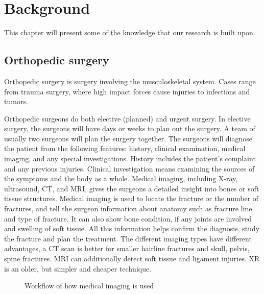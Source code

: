 \documentclass[a4paper]{report}
\begin{document}
\chapter{Background}\label{Background}
This chapter will present some of the knowledge that our research is built upon.

\section{Orthopedic surgery}

Orthopedic surgery is surgery involving the musculoskeletal system. Cases range from trauma surgery, where high impact forces cause injuries to infections and tumors\cite{swiontkowski_manual_2013}.

Orthopedic surgeons do both elective (planned) and urgent surgery. In elective surgery, the surgeons will have days or weeks to plan out the surgery. A team of usually two surgeons will plan the surgery together.
The surgeons will diagnose the patient from the following features: history, clinical examination, medical imaging, and any special investigations. History includes the patient's complaint and any previous injuries. Clinical investigation means examining the sources of the symptoms and the body as a whole. Medical imaging, including X-ray, ultrasound, CT, and MRI, gives the surgeons a detailed insight into bones or soft tissue structures\cite{swiontkowski_manual_2013}.
Medical imaging is used to locate the fracture or the number of fractures, and tell the surgeon information about anatomy such as fracture line and type of fracture. 
It can also show bone condition, if any joints are involved and swelling of soft tissue. All this information helps confirm the diagnosis, study the fracture and plan the treatment\cite{ebnezar_textbook_2016}.
The different imaging types have different advantages, a CT scan is better for smaller hairline fractures and skull, pelvis, spine fractures. MRI can additionally detect soft tissue and ligament injuries. XR is an older, but simpler and cheaper technique\cite{ebnezar_textbook_2016}.

\begin{figure}[h!]
    \centering
	\hfill
  \caption{Workflow of how medical imaging is used}
  \small
\end{figure}
\end{document}
